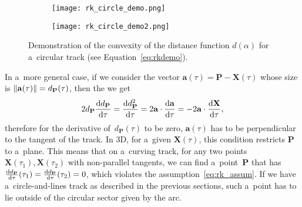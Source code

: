 		\begin{figure}
			\centering
			\begin{subfigure}[t]{0.7\textwidth}
				\centering
				\texttt{[image: rk\_circle\_demo.png]}
			\end{subfigure}
			\hfill
			\begin{subfigure}[t]{0.29\textwidth}
				\centering
				\texttt{[image: rk\_circle\_demo2.png]}
			\end{subfigure}
			\caption{Demonstration of the convexity of the distance function $d(\alpha)$ for a~circular track (see Equation~\ref{eq:rkdemo}).}
			\label{fig:rkdemo}
		\end{figure}
		
		In a~more general case, if we consider the vector $\mathbf{a}(\tau) = \mathbf{P}-\mathbf{X}(\tau)$ whose size is $\norm{\mathbf{a}(\tau)} = d_\mathbf{P}(\tau)$, then the we get
			\begin{equation}
				2d_{\mathbf{P}}\dv{d_{\mathbf{P}}}{\tau}= \dv{d^2_{\mathbf{P}}}{\tau} = 2\mathbf{a}\cdot\dv{\mathbf{a}}{\tau} = -2\mathbf{a}\cdot\dv{\mathbf{X}}{\tau},
			\end{equation}
		therefore for the derivative of~$d_\mathbf{P}(\tau)$ to be zero, $\mathbf{a}(\tau)$ has to be perpendicular to the tangent of the track. In 3D, for a~given $\mathbf{X}(\tau)$, this condition restricts $\mathbf{P}$ to a~plane. This means that on a~curving track, for any two points $\mathbf{X}(\tau_1),\mathbf{X}(\tau_2)$ with non-parallel tangents, we can find a~point~$\mathbf{P}$ that has $\dv{d_{\mathbf{P}}}{\tau}{(\tau_1)} = \dv{d_{\mathbf{P}}}{\tau}{(\tau_2)} = 0$, which violates the assumption~\ref{eq:rk_assum}. If we have a~circle-and-lines track as described in the previous sections, such a~point has to lie outside of the circular sector given by the arc.
		
